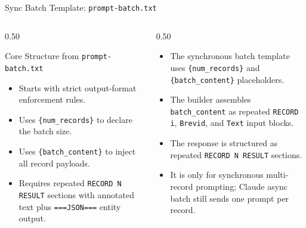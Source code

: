 \documentclass[
        11pt,
        compress,
        xcolor={dvipsnames}
    ]{beamer}
\begin{document}
\begin{frame}{Sync Batch Template: \texttt{prompt-batch.txt}}
  \begin{columns}[T]
    \begin{column}{0.50\textwidth}
      \begin{block}{Core Structure from \texttt{prompt-batch.txt}}
        \footnotesize
        \begin{itemize}\setlength{\itemsep}{0.2em}
          \item Starts with strict output-format enforcement rules.
          \item Uses \texttt{\{num\_records\}} to declare the batch size.
          \item Uses \texttt{\{batch\_content\}} to inject all record payloads.
          \item Requires repeated \texttt{RECORD N RESULT} sections with
            annotated text plus \texttt{===JSON===} entity output.
        \end{itemize}
      \end{block}
    \end{column}
    \begin{column}{0.50\textwidth}
      \small
      \begin{itemize}
        \item The synchronous batch template uses \texttt{\{num\_records\}} and \texttt{\{batch\_content\}} placeholders.
        \item The builder assembles \texttt{batch\_content} as repeated \texttt{RECORD i}, \texttt{Brevid}, and \texttt{Text} input blocks.
        \item The response is structured as repeated \texttt{RECORD N RESULT} sections.
        \item It is only for synchronous multi-record prompting; Claude async batch still sends one prompt per record.
      \end{itemize}
    \end{column}
  \end{columns}
\end{frame}
\end{document}
